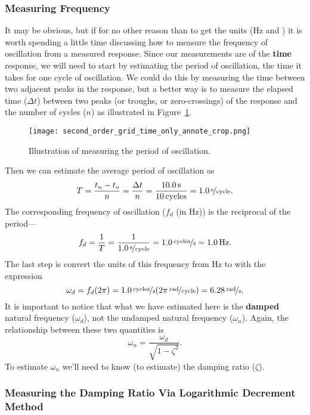 \subsubsection{Measuring Frequency}
It may be obvious, but if for no other reason than to get the units (\unit[]{Hz} and ) it is worth spending a little time discussing how to measure the frequency of oscillation from a measured response.  Since our measurements are of the {\bf time} response, we will need to start by estimating the period of oscillation, the time it takes for one cycle of oscillation.  We could do this by measuring the time between two adjacent peaks in the response, but a better way is to measure the elapsed time ($\Delta t$) between two peaks (or troughs, or zero-crossings) of the response and the number of cycles ($n$) as illustrated in Figure~\ref{f:secondtime}.
\begin{figure}[h!bt]
\centerline{
{\texttt{[image: second\_order\_grid\_time\_only\_annote\_crop.png]}}}
\caption{Illustration of measuring the period of oscillation.}
\label{f:secondtime}
\end{figure}
Then we can estimate the average period of oscillation as
\begin{equation}
T = \frac{t_n-t_o}{n}=\frac{\Delta t}{n}=\frac{\unit[10.0]{s}}{\unit[10]{cycles}} = \unitfrac[1.0]{s}{cycle}.
\end{equation}
The corresponding frequency of oscillation ($f_d$ (in Hz)) is the reciprocal of the period---
\begin{equation}
f_d = \frac{1}{T} = \frac{1}{\unitfrac[1.0]{s}{cycle}} = \unitfrac[1.0]{cycles}{s} = \unit[1.0]{Hz}.
\end{equation}
The last step is convert the units of this frequency from Hz to  with the expression
\begin{equation}
\omega_d = f_d (2 \pi) = \unitfrac[1.0]{cycles}{s} (\unitfrac[2 \pi]{rad}{cycle}) = \unitfrac[6.28]{rad}{s}.
\end{equation}
It is important to notice that what we have estimated here is the {\bf damped} natural frequency ($\omega_d$), not the undamped natural frequency ($\omega_n$).  Again, the relationship between these two quantities is
\begin{equation}
\omega_n = \frac{\omega_d}{\sqrt{1-\zeta^2}}.
\end{equation}
To estimate $\omega_n$ we'll need to know (to estimate) the damping ratio ($\zeta$).

\subsubsection{Measuring the Damping Ratio Via Logarithmic Decrement Method}

